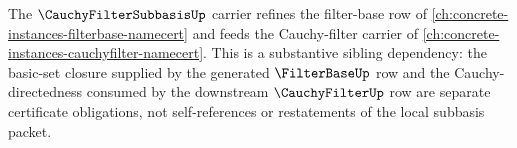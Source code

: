 The $\CauchyFilterSubbasisUp$ carrier refines the filter-base row of \autoref{ch:concrete-instances-filterbase-namecert} and feeds the Cauchy-filter carrier of \autoref{ch:concrete-instances-cauchyfilter-namecert}. This is a substantive sibling dependency: the basic-set closure supplied by the generated $\FilterBaseUp$ row and the Cauchy-directedness consumed by the downstream $\CauchyFilterUp$ row are separate certificate obligations, not self-references or restatements of the local subbasis packet.
